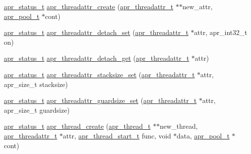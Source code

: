 \begin{DoxyCompactItemize}
\item 
\hyperlink{group__apr__errno_gaf76ee4543247e9fb3f3546203e590a6c}{apr\+\_\+status\+\_\+t} \hyperlink{group__apr__thread__proc_ga66c2f55e5dff9ac37bd32e9febd38da5}{apr\+\_\+threadattr\+\_\+create} (\hyperlink{group__apr__thread__proc_ga35de571e9944871c10b38d8feef885ac}{apr\+\_\+threadattr\+\_\+t} $\ast$$\ast$new\+\_\+attr, \hyperlink{group__apr__pools_gaf137f28edcf9a086cd6bc36c20d7cdfb}{apr\+\_\+pool\+\_\+t} $\ast$cont)
\item 
\hyperlink{group__apr__errno_gaf76ee4543247e9fb3f3546203e590a6c}{apr\+\_\+status\+\_\+t} \hyperlink{group__apr__thread__proc_ga85d44b3b021f28116122d5e40e024648}{apr\+\_\+threadattr\+\_\+detach\+\_\+set} (\hyperlink{group__apr__thread__proc_ga35de571e9944871c10b38d8feef885ac}{apr\+\_\+threadattr\+\_\+t} $\ast$attr, apr\+\_\+int32\+\_\+t on)
\item 
\hyperlink{group__apr__errno_gaf76ee4543247e9fb3f3546203e590a6c}{apr\+\_\+status\+\_\+t} \hyperlink{group__apr__thread__proc_gae5b7cdb3de542d1b7b52fe5d9d8cb00b}{apr\+\_\+threadattr\+\_\+detach\+\_\+get} (\hyperlink{group__apr__thread__proc_ga35de571e9944871c10b38d8feef885ac}{apr\+\_\+threadattr\+\_\+t} $\ast$attr)
\item 
\hyperlink{group__apr__errno_gaf76ee4543247e9fb3f3546203e590a6c}{apr\+\_\+status\+\_\+t} \hyperlink{group__apr__thread__proc_ga7849e0d637338a18cb44f66f11f28ed1}{apr\+\_\+threadattr\+\_\+stacksize\+\_\+set} (\hyperlink{group__apr__thread__proc_ga35de571e9944871c10b38d8feef885ac}{apr\+\_\+threadattr\+\_\+t} $\ast$attr, apr\+\_\+size\+\_\+t stacksize)
\item 
\hyperlink{group__apr__errno_gaf76ee4543247e9fb3f3546203e590a6c}{apr\+\_\+status\+\_\+t} \hyperlink{group__apr__thread__proc_ga2e732f2913291180c0c484f57d727140}{apr\+\_\+threadattr\+\_\+guardsize\+\_\+set} (\hyperlink{group__apr__thread__proc_ga35de571e9944871c10b38d8feef885ac}{apr\+\_\+threadattr\+\_\+t} $\ast$attr, apr\+\_\+size\+\_\+t guardsize)
\item 
\hyperlink{group__apr__errno_gaf76ee4543247e9fb3f3546203e590a6c}{apr\+\_\+status\+\_\+t} \hyperlink{group__apr__thread__proc_gaeba6593f43f1de94c2b4495dd72b0e9f}{apr\+\_\+thread\+\_\+create} (\hyperlink{group__apr__thread__proc_ga646c71351e723d84f8cc8c8d1d5937be}{apr\+\_\+thread\+\_\+t} $\ast$$\ast$new\+\_\+thread, \hyperlink{group__apr__thread__proc_ga35de571e9944871c10b38d8feef885ac}{apr\+\_\+threadattr\+\_\+t} $\ast$attr, \hyperlink{group__apr__thread__proc_gaa1f88d2a6fe971ac200e466cae5f63e0}{apr\+\_\+thread\+\_\+start\+\_\+t} func, void $\ast$data, \hyperlink{group__apr__pools_gaf137f28edcf9a086cd6bc36c20d7cdfb}{apr\+\_\+pool\+\_\+t} $\ast$cont)

\end{DoxyCompactItemize}
